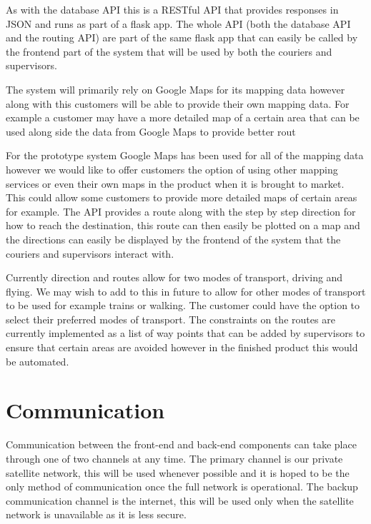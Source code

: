 As with the database API this is a RESTful API that provides responses in JSON and runs as part of a flask app. The whole API (both the database API and the routing API) are part of the same flask app that can easily be called by the frontend part of the system that will be used by both the couriers and supervisors.

The system will primarily rely on Google Maps \cite{GoogleMaps} for its mapping data however along with this customers will be able to provide their own mapping data. For example a customer may have a more detailed map of a certain area that can be used along side the data from Google Maps to provide better rout 

For the prototype system Google Maps has been used for all of the mapping data however we would like to offer customers the option of using other mapping services or even their own maps in the product when it is brought to market. This could allow some customers to provide more detailed maps of certain areas for example. The API provides a route along with the step by step direction for how to reach the destination, this route can then easily be plotted on a map and the directions can easily be displayed by the frontend of the system that the couriers and supervisors interact with.

Currently direction and routes allow for two modes of transport, driving and flying. We may wish to add to this in future to allow for other modes of transport to be used for example trains or walking. The customer could have the option to select their preferred modes of transport. The constraints on the routes are currently implemented as a list of way points that can be added by supervisors to ensure that certain areas are avoided however in the finished product this would be automated.



\section{Communication} \label{communicationarch}
Communication between the front-end and back-end components can take place through one of two channels at any time. The primary channel is our private satellite network, this will be used whenever possible and it is hoped to be the only method of communication once the full network is operational. The backup communication channel is the internet, this will be used only when the satellite network is unavailable as it is less secure. 

